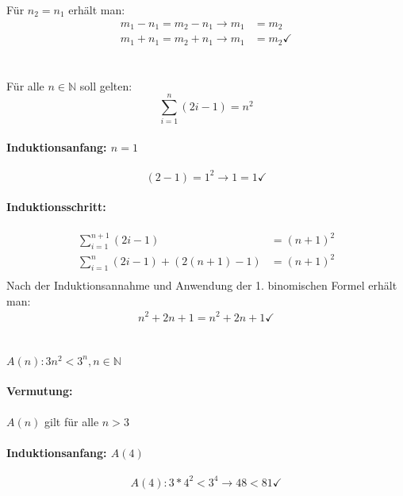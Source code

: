 \documentclass[11pt,a4paper]{article}
\begin{document}
Für $n_2 = n_1$ erhält man:
\begin{align*}
m_1-n_1 = m_2-n_1 \rightarrow m_1 &= m_2\\
m_1+n_1 = m_2+n_1 \rightarrow m_1 &= m_2 \checkmark
\end{align*}


\section{}
Für alle $n \in \mathbb{N}$ soll gelten:
\begin{equation*}
\sum_{i=1}^{n} (2i-1) = n^2
\end{equation*}

\paragraph{Induktionsanfang: $n=1$}
\begin{equation*}
(2-1) = 1^2 \rightarrow 1 = 1 \checkmark
\end{equation*}

\paragraph{Induktionsschritt:}
\begin{align*}
\sum_{i=1}^{n+1} (2i-1) &= (n+1)^2\\
\sum_{i=1}^{n} (2i-1) + (2(n+1)-1) &= (n+1)^2\\
\end{align*}
Nach der Induktionsannahme und Anwendung der 1. binomischen Formel erhält man:
\begin{align*}
n^2 + 2n + 1 = n^2 + 2n + 1 \checkmark
\end{align*}

\section{}
$A(n): 3n^2 < 3^n, n \in \mathbb{N}$

\paragraph{Vermutung:}
$A(n)$ gilt für alle $n > 3$

\paragraph{Induktionsanfang: $A(4)$}
\begin{equation*}
A(4): 3*4^2 < 3^4 \rightarrow 48 < 81 \checkmark
\end{equation*}
\end{document}
